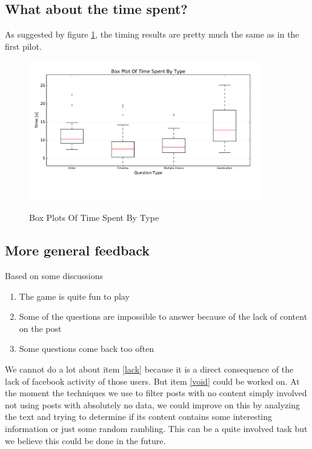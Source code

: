 \subsection{What about the time spent?}
As suggested by figure \ref{fig:p2BoxesTime}, the timing results are pretty much the same as in the first pilot.
\begin{figure}
\centering
{\includegraphics[width=4in]{images/pilot_2_boxplot_time.pdf}}
\caption{Box Plots Of Time Spent By Type}
\label{fig:p2BoxesTime}
\end{figure}

\subsection{More general feedback}
Based on some discussions
\begin{enumerate}
	\item The game is quite fun to play
	\item\label{void} Some of the questions are impossible to answer because of the lack of content on the post
	\item\label{lack} Some questions come back too often
\end{enumerate}
We cannot do a lot about item \ref{lack} because it is a direct consequence of the lack of facebook activity of those users. But item \ref{void} could be worked on. At the moment the techniques we use to filter posts with no content simply involved not using posts with absolutely no data, we could improve on this by analyzing the text and trying to determine if its content contains some interesting information or just some random rambling. This can be a quite involved task but we believe this could be done in the future.